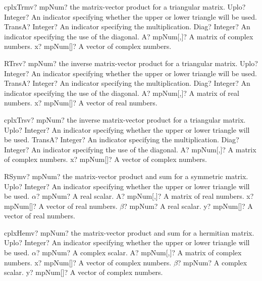 \documentclass[12pt,a4paper,openany]{book}
\begin{document}
\begin{mpFunctionsExtract}
\mpFunctionFive
{cplxTrmv? mpNum?  the matrix-vector product for a triangular matrix.}
{Uplo? Integer? An indicator specifying whether the upper or lower triangle will be used.}
{TransA? Integer? An indicator specifying the multiplication.}
{Diag? Integer? An indicator specifying the use of the diagonal.}
{A? mpNum[,]? A matrix of complex numbers.}
{x? mpNum[]? A vector of complex numbers.}
\end{mpFunctionsExtract}

\begin{mpFunctionsExtract}
\mpFunctionFive
{RTrsv? mpNum?  the inverse matrix-vector product for a triangular matrix.}
{Uplo? Integer? An indicator specifying whether the upper or lower triangle will be used.}
{TransA? Integer? An indicator specifying the multiplication.}
{Diag? Integer? An indicator specifying the use of the diagonal.}
{A? mpNum[,]? A matrix of real numbers.}
{x? mpNum[]? A vector of real numbers.}
\end{mpFunctionsExtract}

\begin{mpFunctionsExtract}
\mpFunctionFive
{cplxTrsv? mpNum?  the inverse matrix-vector product for a triangular matrix.}
{Uplo? Integer? An indicator specifying whether the upper or lower triangle will be used.}
{TransA? Integer? An indicator specifying the multiplication.}
{Diag? Integer? An indicator specifying the use of the diagonal.}
{A? mpNum[,]? A matrix of complex numbers.}
{x? mpNum[]? A vector of complex numbers.}
\end{mpFunctionsExtract}

\begin{mpFunctionsExtract}
\mpFunctionSix
{RSymv? mpNum? the matrix-vector product and sum for a symmetric matrix.}
{Uplo? Integer? An indicator specifying whether the upper or lower triangle will be used.}
{$\alpha$? mpNum? A real scalar.}
{A? mpNum[,]? A matrix of real numbers.}
{x? mpNum[]? A vector of real numbers.}
{$\beta$? mpNum? A real scalar.}
{y? mpNum[]? A vector of real numbers.}
\end{mpFunctionsExtract}

\begin{mpFunctionsExtract}
\mpFunctionSix
{cplxHemv? mpNum? the matrix-vector product and sum for a hermitian matrix.}
{Uplo? Integer? An indicator specifying whether the upper or lower triangle will be used.}
{$\alpha$? mpNum? A complex scalar.}
{A? mpNum[,]? A matrix of complex numbers.}
{x? mpNum[]? A vector of complex numbers.}
{$\beta$? mpNum? A complex scalar.}
{y? mpNum[]? A vector of complex numbers.}
\end{mpFunctionsExtract}
\end{document}
